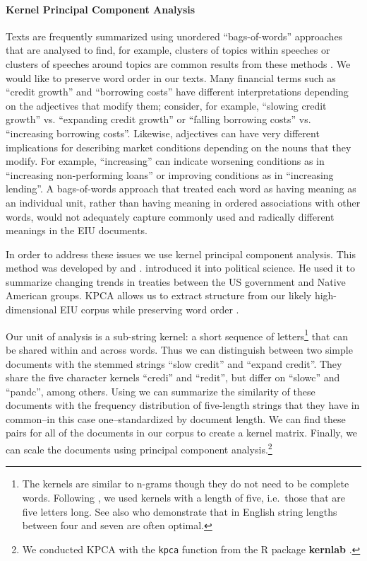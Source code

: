 \documentclass[]{article}
\begin{document}
\paragraph{Kernel Principal Component
Analysis}\label{kernel-principal-component-analysis}

Texts are frequently summarized using unordered ``bags-of-words''
approaches that are analysed to find, for example, clusters of topics within speeches or clusters of speeches around topics are common results from these methods \citep[for a review see][]{Grimmer2013}. We would like to preserve word order in our texts. Many financial terms such as ``credit growth'' and ``borrowing costs'' have different interpretations depending on the adjectives that modify them; consider, for example, ``slowing credit growth'' vs. ``expanding credit growth'' or ``falling borrowing costs'' vs. ``increasing borrowing costs''. Likewise, adjectives can have very different implications for describing market conditions depending on the nouns that they modify. For example, ``increasing'' can indicate worsening conditions as in ``increasing non-performing loans'' or improving conditions as in ``increasing lending''.  A bags-of-words approach that treated each word as having meaning as an individual unit, rather than having meaning in ordered associations with other words, would not adequately capture commonly used and radically different meanings in the EIU documents.

In order to address these issues we use kernel principal component analysis. This method was developed by \cite{Scholkopf1998} and \cite{lodhi2002}. \cite{Spirling2012} introduced it into political science. He used it to summarize changing trends in treaties between the US government and Native American groups. KPCA allows us to extract structure from our likely high-dimensional EIU corpus while preserving word order \cite[6531--6537]{Zhang2010}.

Our unit of analysis is a sub-string kernel: a short sequence of letters\footnote{The kernels are similar to n-grams though they do not need to be complete words. Following \cite{Spirling2012}, we used kernels with a length of five, i.e.~those that are five letters long. See also \cite{lodhi2002} who demonstrate that in English string lengths between four and seven are often optimal.} that can be shared within and across words. Thus we can distinguish between two simple documents with the stemmed strings ``slow credit'' and ``expand credit''. They share the five character kernels ``credi'' and ``redit'', but differ on ``slowc'' and ``pandc'', among others. Using \cite{lodhi2002} we can summarize the similarity of these documents with the frequency distribution of five-length strings that they have in common--in this case one--standardized by document length. We can find these pairs for all of the documents in our corpus to create a kernel matrix. Finally, we can scale the documents using principal component analysis.\footnote{We conducted KPCA with the \texttt{kpca} function from the R package \textbf{kernlab} \citep{kerblabCite}.}
\end{document}
